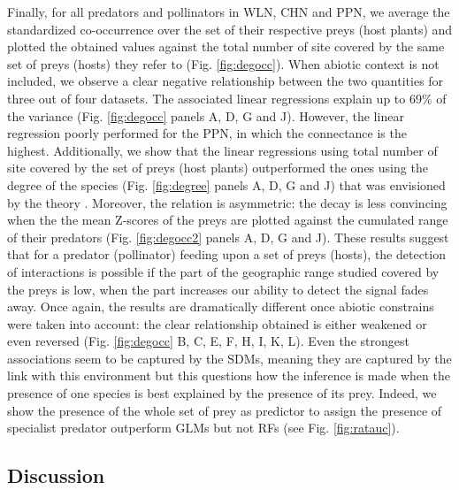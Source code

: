 Finally, for all predators and pollinators in WLN, CHN and PPN, we
average the standardized co-occurrence over the set of their respective
preys (host plants) and plotted the obtained values against the total
number of site covered by the same set of preys (hosts) they refer to
(Fig. \ref{fig:degocc}). When abiotic context is not included, we
observe a clear negative relationship between the two quantities for
three out of four datasets. The associated linear regressions explain up
to 69\% of the variance (Fig. \ref{fig:degocc} panels A, D, G and J).
However, the linear regression poorly performed for the PPN, in which
the connectance is the highest. Additionally, we show that the linear
regressions using total number of site covered by the set of preys (host
plants) outperformed the ones using the degree of the species (Fig.
\ref{fig:degree} panels A, D, G and J) that was envisioned by the theory
\citep{Cazelles2016}. Moreover, the relation is asymmetric: the decay is
less convincing when the the mean Z-scores of the preys are plotted
against the cumulated range of their predators (Fig. \ref{fig:degocc2}
panels A, D, G and J). These results suggest that for a predator
(pollinator) feeding upon a set of preys (hosts), the detection of
interactions is possible if the part of the geographic range studied
covered by the preys is low, when the part increases our ability to
detect the signal fades away. Once again, the results are dramatically
different once abiotic constrains were taken into account: the clear
relationship obtained is either weakened or even reversed (Fig.
\ref{fig:degocc} B, C, E, F, H, I, K, L). Even the strongest
associations seem to be captured by the SDMs, meaning they are captured
by the link with this environment but this questions how the inference
is made when the presence of one species is best explained by the
presence of its prey. Indeed, we show the presence of the whole set of
prey as predictor to assign the presence of specialist predator
outperform GLMs but not RFs (see Fig. \ref{fig:ratauc}).

\subsection{Discussion}\label{discussion}

